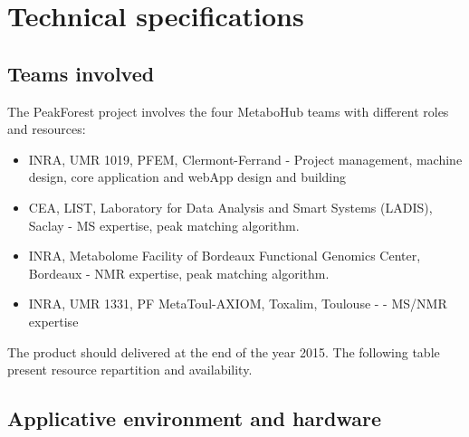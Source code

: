 
\section{Technical specifications}

\subsection{Teams involved}

The PeakForest project involves the four MetaboHub teams with different roles and resources:
\begin{itemize}
	\item INRA, UMR 1019, PFEM, Clermont-Ferrand  - Project management, machine design, core application and webApp design and building 
	\item CEA, LIST, Laboratory for Data Analysis and Smart Systems (LADIS),  Saclay - MS expertise, peak matching algorithm.
	\item INRA, Metabolome Facility of Bordeaux Functional Genomics Center, Bordeaux - NMR expertise, peak matching algorithm.
	\item INRA, UMR 1331, PF MetaToul-AXIOM, Toxalim, Toulouse - - MS/NMR expertise
\end{itemize}

The product should delivered at the end of the year 2015. The following table present resource repartition and availability.
\begin{figure}[htbp]
	\centering
\end{figure}


\subsection{Applicative environment and hardware}

